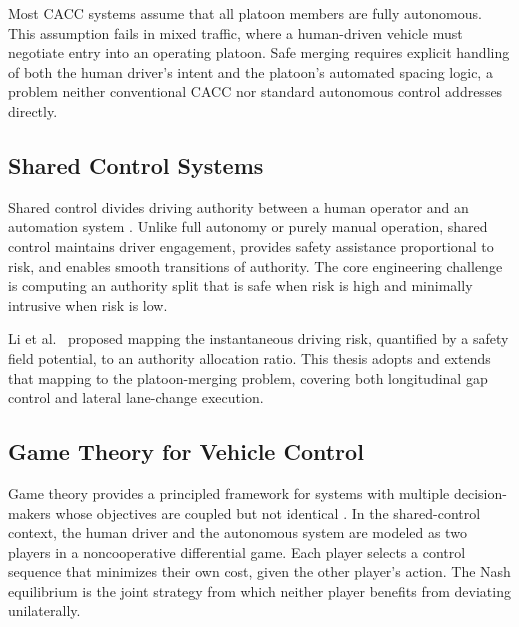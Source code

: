 \documentclass[12pt,a4paper,oneside]{report}
\begin{document}
Most CACC systems assume that all platoon members are fully autonomous. This assumption fails in mixed traffic, where a human-driven vehicle must negotiate entry into an operating platoon. Safe merging requires explicit handling of both the human driver's intent and the platoon's automated spacing logic, a problem neither conventional CACC nor standard autonomous control addresses directly.


\subsection{Shared Control Systems}

Shared control divides driving authority between a human operator and an automation system \cite{liSharedControlNovel2019}. Unlike full autonomy or purely manual operation, shared control maintains driver engagement, provides safety assistance proportional to risk, and enables smooth transitions of authority. The core engineering challenge is computing an authority split that is safe when risk is high and minimally intrusive when risk is low.

Li et al.\ \cite{liSharedControlNovel2019} proposed mapping the instantaneous driving risk, quantified by a safety field potential, to an authority allocation ratio. This thesis adopts and extends that mapping to the platoon-merging problem, covering both longitudinal gap control and lateral lane-change execution.


\subsection{Game Theory for Vehicle Control}

Game theory provides a principled framework for systems with multiple decision-makers whose objectives are coupled but not identical \cite{basarDynamicNoncooperativeGame1999}. In the shared-control context, the human driver and the autonomous system are modeled as two players in a noncooperative differential game. Each player selects a control sequence that minimizes their own cost, given the other player's action. The Nash equilibrium is the joint strategy from which neither player benefits from deviating unilaterally.
\end{document}
